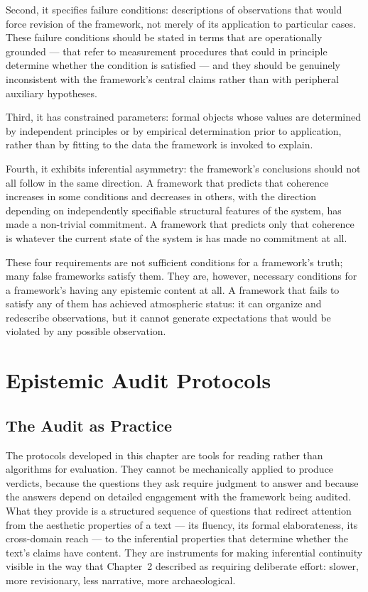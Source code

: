 \documentclass[12pt, openright, twoside]{book}
\begin{document}
Second, it specifies failure conditions: descriptions of observations that
would force revision of the framework, not merely of its application to
particular cases. These failure conditions should be stated in terms that
are operationally grounded --- that refer to measurement procedures that
could in principle determine whether the condition is satisfied --- and
they should be genuinely inconsistent with the framework's central claims
rather than with peripheral auxiliary hypotheses.

Third, it has constrained parameters: formal objects whose values are
determined by independent principles or by empirical determination prior
to application, rather than by fitting to the data the framework is
invoked to explain.

Fourth, it exhibits inferential asymmetry: the framework's conclusions
should not all follow in the same direction. A framework that predicts
that coherence increases in some conditions and decreases in others, with
the direction depending on independently specifiable structural features
of the system, has made a non-trivial commitment. A framework that predicts
only that coherence is whatever the current state of the system is has
made no commitment at all.

These four requirements are not sufficient conditions for a framework's
truth; many false frameworks satisfy them. They are, however, necessary
conditions for a framework's having any epistemic content at all. A framework
that fails to satisfy any of them has achieved atmospheric status: it
can organize and redescribe observations, but it cannot generate
expectations that would be violated by any possible observation.

\chapter{Epistemic Audit Protocols}

\section{The Audit as Practice}

The protocols developed in this chapter are tools for reading rather than
algorithms for evaluation. They cannot be mechanically applied to produce
verdicts, because the questions they ask require judgment to answer and
because the answers depend on detailed engagement with the framework being
audited. What they provide is a structured sequence of questions that
redirect attention from the aesthetic properties of a text --- its fluency,
its formal elaborateness, its cross-domain reach --- to the inferential
properties that determine whether the text's claims have content. They are
instruments for making inferential continuity visible in the way that
Chapter~2 described as requiring deliberate effort: slower, more revisionary,
less narrative, more archaeological.
\end{document}
